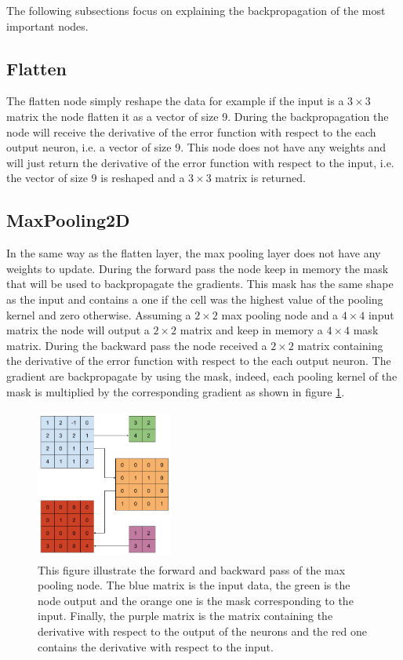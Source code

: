 \documentclass[11pt]{report}
\begin{document}
\noindent The following subsections focus on explaining the backpropagation of the most important nodes.

\subsection{Flatten}

The flatten node simply reshape the data for example if the input is a $3\times3$ matrix the node flatten it as a vector of size 9. During the backpropagation the node will receive the derivative of the error function with respect to the each output neuron, i.e. a vector of size 9. This node does not have any weights and will just return the derivative of the error function with respect to the input, i.e. the vector of size 9 is reshaped and a $3\times3$ matrix is returned.

\subsection{MaxPooling2D}

In the same way as the flatten layer, the max pooling layer does not have any weights to update. During the forward pass the node keep in memory the mask that will be used to backpropagate the gradients. This mask has the same shape as the input and contains a one if the cell was the highest value of the pooling kernel and zero otherwise. Assuming a $2\times2$ max pooling node and a $4\times4$ input matrix the node will output a $2\times2$ matrix and keep in memory a $4\times4$ mask matrix. During the backward pass the node received a $2\times2$ matrix containing the derivative of the error function with respect to the each output neuron. The gradient are backpropagate by using the mask, indeed, each pooling kernel of the mask is multiplied by the corresponding gradient as shown in figure \ref{fig:max_pooling_bp}.

\begin{figure}[h]
\centering
\includegraphics[width=4.5cm, height=5cm]{max_pooling_bp}
\caption[Backropagation in max pooling layer]{This figure illustrate the forward and backward pass of the max pooling node. The blue matrix is the input data, the green is the node output and the orange one is the mask corresponding to the input. Finally, the purple matrix is the matrix containing the derivative with respect to the output of the neurons and the red one contains the derivative with respect to the input.}
\label{fig:max_pooling_bp}
\end{figure}
\end{document}
